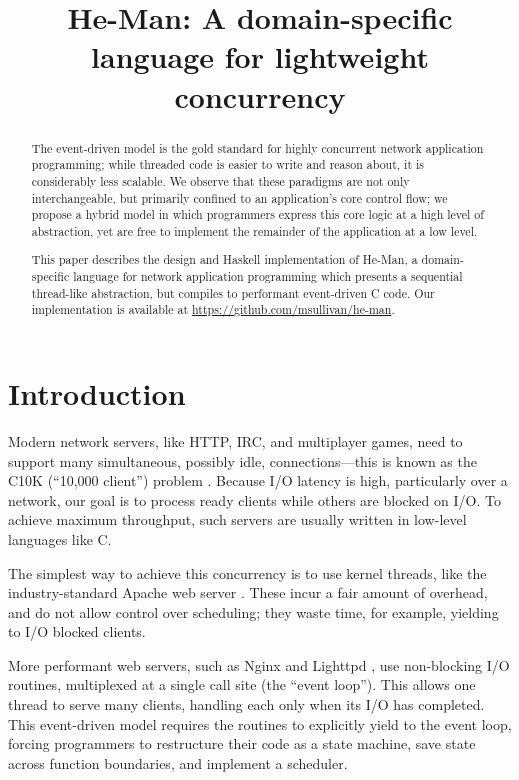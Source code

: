 \documentclass[preprint]{sigplanconf}
\title{He-Man: A domain-specific language for lightweight concurrency}
\begin{document}
\maketitle

\begin{abstract}
The event-driven model is the gold standard for highly concurrent network
application programming; while threaded code is easier to write and reason
about, it is considerably less scalable. We observe that these paradigms are not
only interchangeable, but primarily confined to an application's core control
flow; we propose a hybrid model in which programmers express this core logic at
a high level of abstraction, yet are free to implement the remainder of the
application at a low level.

This paper describes the design and Haskell implementation of He-Man, a
domain-specific language for network application programming which presents a
sequential thread-like abstraction, but compiles to performant event-driven C
code. Our implementation is available at
\url{https://github.com/msullivan/he-man}. %
\end{abstract}

\section{Introduction}

Modern network servers, like HTTP, IRC, and multiplayer games, need to support
many simultaneous, possibly idle, connections---this is known as the C10K
(``10,000 client'') problem \cite{Kegel}. Because I/O latency is high,
particularly over a network, our goal is to process ready clients while others
are blocked on I/O. To achieve maximum throughput, such servers are usually
written in low-level languages like C.

The simplest way to achieve this concurrency is to use kernel threads, like the
industry-standard Apache web server \cite{Apache}. These incur a fair amount of
overhead, and do not allow control over scheduling; they waste time, for
example, yielding to I/O blocked clients.

More performant web servers, such as Nginx \cite{Nginx} and Lighttpd
\cite{Lighttpd}, use non-blocking I/O routines, multiplexed at a single call
site (the ``event loop''). This allows one thread to serve many clients,
handling each only when its I/O has completed. This event-driven model requires
the routines to explicitly yield to the event loop, forcing programmers to
restructure their code as a state machine, save state across function
boundaries, and implement a scheduler. 
\end{document}
